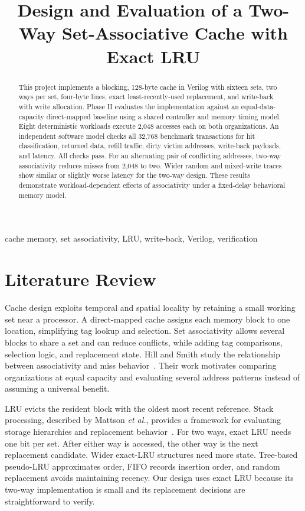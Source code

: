 \documentclass[conference]{IEEEtran}
\title{Design and Evaluation of a Two-Way Set-Associative Cache with Exact LRU}
\author{\IEEEauthorblockN{Aaditya Yadav, Gauri Mishra, Bhumi Rastogi, Ansh Sharma, and Anugra}}
\begin{document}
\maketitle
\begin{abstract}
This project implements a blocking, 128-byte cache in Verilog with sixteen
sets, two ways per set, four-byte lines, exact least-recently-used replacement,
and write-back with write allocation. Phase II evaluates the implementation
against an equal-data-capacity direct-mapped baseline using a shared controller
and memory timing model. Eight deterministic workloads execute 2,048 accesses
each on both organizations. An independent software model checks all 32,768
benchmark transactions for hit classification, returned data, refill traffic,
dirty victim addresses, write-back payloads, and latency. All checks pass.
For an alternating pair of conflicting addresses, two-way associativity
reduces misses from 2,048 to two. Wider random and mixed-write traces show
similar or slightly worse latency for the two-way design. These results
demonstrate workload-dependent effects of associativity under a fixed-delay
behavioral memory model.
\end{abstract}
\begin{IEEEkeywords}
cache memory, set associativity, LRU, write-back, Verilog, verification
\end{IEEEkeywords}

\section{Literature Review}
Cache design exploits temporal and spatial locality by retaining a small
working set near a processor. A direct-mapped cache assigns each memory block
to one location, simplifying tag lookup and selection. Set associativity
allows several blocks to share a set and can reduce conflicts, while adding
tag comparisons, selection logic, and replacement state. Hill and Smith study
the relationship between associativity and miss behavior~\cite{hill}. Their
work motivates comparing organizations at equal capacity and evaluating
several address patterns instead of assuming a universal benefit.

LRU evicts the resident block with the oldest most recent reference. Stack
processing, described by Mattson \emph{et al.}, provides a framework for
evaluating storage hierarchies and replacement behavior~\cite{mattson}.
For two ways, exact LRU needs one bit per set. After either way is accessed,
the other way is the next replacement candidate. Wider exact-LRU structures
need more state. Tree-based pseudo-LRU approximates order, FIFO records
insertion order, and random replacement avoids maintaining recency.
Our design uses exact LRU because its two-way implementation is small and
its replacement decisions are straightforward to verify.
\end{document}
